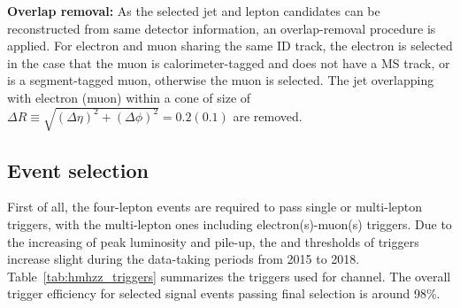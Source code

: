 \textbf{Overlap removal:}
As the selected jet and lepton candidates can be reconstructed from same detector information, an overlap-removal procedure is applied.
For electron and muon sharing the same ID track, the electron is selected in the case that the muon is calorimeter-tagged and does not have a MS track, or is a segment-tagged muon, otherwise the muon is selected.
The jet overlapping with electron (muon) within a cone of size of $\Delta R\equiv \sqrt{(\Delta \eta)^2 + (\Delta \phi)^2}= 0.2(0.1)$ are removed.

\subsection{Event selection}
\label{sec:hmhzz_eventsel}

First of all, the four-lepton events are required to pass single or multi-lepton triggers, with the multi-lepton ones including electron(s)-muon(s) triggers.
Due to the increasing of peak luminosity and pile-up, the \pt and \et thresholds of triggers increase slight during the data-taking periods from 2015 to 2018.
Table~\ref{tab:hmhzz_triggers} summarizes the triggers used for \lllljj channel. 
The overall trigger efficiency for selected signal events passing final selection is around 98\%.

